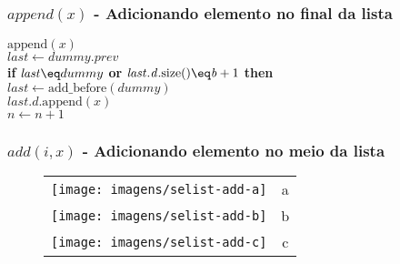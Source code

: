 \documentclass{beamer}
\begin{document}
\begin{frame}[shrink]
\frametitle{$append(x)$ - Adicionando elemento no final da lista}
\begin{oframed}
\begin{flushleft}
\hspace*{1em} \ensuremath{\mathrm{append}(\ensuremath{\mathit{x}})}\\
\hspace*{1em} \hspace*{1em} \ensuremath{\ensuremath{\mathit{last}} \gets  \ensuremath{\ensuremath{\mathit{dummy}}.prev}}\\
\hspace*{1em} \hspace*{1em} {\color{black} \textbf{if}} \ensuremath{\ensuremath{\mathit{last}} \eq dummy} {\color{black} \textbf{or}} \ensuremath{\ensuremath{\mathit{last}}.\ensuremath{\mathit{d}}.\mathrm{size}() \eq \ensuremath{\mathit{b}}+1} {\color{black} \textbf{then}} \\
\hspace*{1em} \hspace*{1em} \hspace*{1em} \ensuremath{\ensuremath{\mathit{last}} \gets  \ensuremath{\mathrm{add\_before}(\ensuremath{\mathit{dummy}})}}\\
\hspace*{1em} \hspace*{1em} \ensuremath{\ensuremath{\mathit{last}}.\ensuremath{\mathit{d}}.\mathrm{append}(\ensuremath{\mathit{x}})}\\
\hspace*{1em} \hspace*{1em} \ensuremath{\ensuremath{\mathit{n}} \gets  \ensuremath{\ensuremath{\mathit{n}} + 1}}\\
\end{flushleft}
\end{oframed}
\end{frame}

\begin{frame}[shrink]
\frametitle{$add(i,x)$ - Adicionando elemento no meio da lista}
\begin{figure}
  \noindent
  \begin{center}
    \begin{tabular}{@{}l@{}c}
      \texttt{[image: imagens/selist-add-a]}& a\\[4ex]
      \texttt{[image: imagens/selist-add-b]}& b\\[4ex]
      \texttt{[image: imagens/selist-add-c]}& c\\
    \end{tabular}
  \end{center}
\end{figure}
\end{frame}
\end{document}
